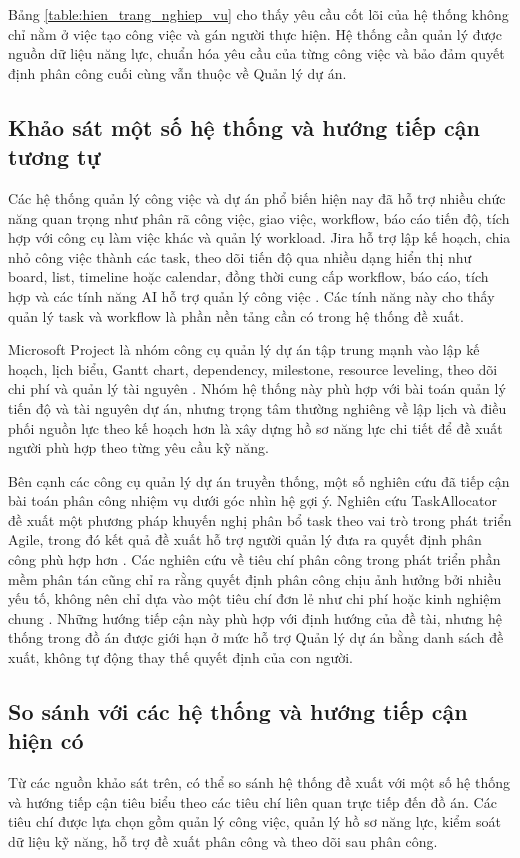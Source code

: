 \documentclass[../DoAn.tex]{subfiles}
\begin{document}
Bảng \ref{table:hien_trang_nghiep_vu} cho thấy yêu cầu cốt lõi của hệ thống không chỉ nằm ở việc tạo công việc và gán người thực hiện. Hệ thống cần quản lý được nguồn dữ liệu năng lực, chuẩn hóa yêu cầu của từng công việc và bảo đảm quyết định phân công cuối cùng vẫn thuộc về Quản lý dự án.

\subsection{Khảo sát một số hệ thống và hướng tiếp cận tương tự}
\label{subsection:2.1.3}
Các hệ thống quản lý công việc và dự án phổ biến hiện nay đã hỗ trợ nhiều chức năng quan trọng như phân rã công việc, giao việc, workflow, báo cáo tiến độ, tích hợp với công cụ làm việc khác và quản lý workload. Jira hỗ trợ lập kế hoạch, chia nhỏ công việc thành các task, theo dõi tiến độ qua nhiều dạng hiển thị như board, list, timeline hoặc calendar, đồng thời cung cấp workflow, báo cáo, tích hợp và các tính năng AI hỗ trợ quản lý công việc \cite{atlassianJiraFeatures}. Các tính năng này cho thấy quản lý task và workflow là phần nền tảng cần có trong hệ thống đề xuất.

Microsoft Project là nhóm công cụ quản lý dự án tập trung mạnh vào lập kế hoạch, lịch biểu, Gantt chart, dependency, milestone, resource leveling, theo dõi chi phí và quản lý tài nguyên \cite{microsoftProjectPlans}. Nhóm hệ thống này phù hợp với bài toán quản lý tiến độ và tài nguyên dự án, nhưng trọng tâm thường nghiêng về lập lịch và điều phối nguồn lực theo kế hoạch hơn là xây dựng hồ sơ năng lực chi tiết để đề xuất người phù hợp theo từng yêu cầu kỹ năng.

Bên cạnh các công cụ quản lý dự án truyền thống, một số nghiên cứu đã tiếp cận bài toán phân công nhiệm vụ dưới góc nhìn hệ gợi ý. Nghiên cứu TaskAllocator đề xuất một phương pháp khuyến nghị phân bổ task theo vai trò trong phát triển Agile, trong đó kết quả đề xuất hỗ trợ người quản lý đưa ra quyết định phân công phù hợp hơn \cite{shafiq2021taskallocator}. Các nghiên cứu về tiêu chí phân công trong phát triển phần mềm phân tán cũng chỉ ra rằng quyết định phân công chịu ảnh hưởng bởi nhiều yếu tố, không nên chỉ dựa vào một tiêu chí đơn lẻ như chi phí hoặc kinh nghiệm chung \cite{lamersdorf2013survey}. Những hướng tiếp cận này phù hợp với định hướng của đề tài, nhưng hệ thống trong đồ án được giới hạn ở mức hỗ trợ Quản lý dự án bằng danh sách đề xuất, không tự động thay thế quyết định của con người.

\subsection{So sánh với các hệ thống và hướng tiếp cận hiện có}
\label{subsection:2.1.4}
Từ các nguồn khảo sát trên, có thể so sánh hệ thống đề xuất với một số hệ thống và hướng tiếp cận tiêu biểu theo các tiêu chí liên quan trực tiếp đến đồ án. Các tiêu chí được lựa chọn gồm quản lý công việc, quản lý hồ sơ năng lực, kiểm soát dữ liệu kỹ năng, hỗ trợ đề xuất phân công và theo dõi sau phân công.
\end{document}
